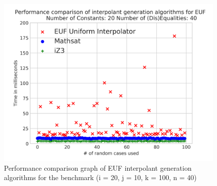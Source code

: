 \begin{figure}
  \centering
  \includegraphics[scale=0.9]{figures/eufi_performance_graph_20_10_3_40_100}
  \caption{Performance comparison graph of EUF interpolant generation
  algorithms for the benchmark (i = 20, j = 10, k = 100, n = 40)} 

  \label{performance_graph_euf_2}
\end{figure}

